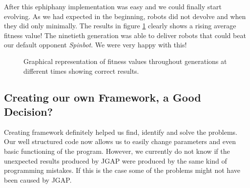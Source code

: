 \documentclass[a4paper,10pt]{article}
\begin{document}
After this ephiphany implementation was easy and we could finally start evolving. As we had expected in the beginning, robots did not devolve and when they did only 
minimally. The results in figure \ref{fig:result_3} clearly shows a rising average fitness value! The ninetieth generation was able to deliver robots that could beat
our default opponent \textit{Spinbot}. We were very happy with this! 

\begin{figure}[h!]
  \centering
  \caption{Graphical representation of fitness values throughout generations at different times showing correct results.}
  \label{fig:result_3}
\end{figure}

\subsection{Creating our own Framework, a Good Decision?}
Creating framework definitely helped us find, identify and solve the problems. Our well structured code now allows us to easily change parameters and even basic 
functioning of 
the program. However, we currently do not know if the unexpected results produced by JGAP were produced by the same kind of programming mistakes. If this is the case some
of the problems might not have been caused by JGAP. \\
\end{document}
